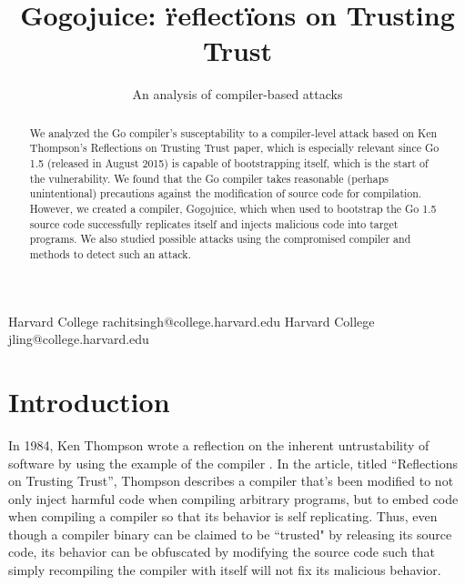 \documentclass[10pt]{sigplanconf}
\begin{document}
\setlength{\pdfpageheight}{\paperheight}
\setlength{\pdfpagewidth}{\paperwidth}






\title{Gogojuice: \"reflect\"ions on Trusting Trust}
\subtitle{An analysis of compiler-based attacks}

           {Harvard College}
           {rachitsingh@college.harvard.edu}
           {Harvard College}
           {jling@college.harvard.edu}


\begin{abstract}
We analyzed the Go compiler's susceptability to a compiler-level attack based on Ken Thompson's Reflections on Trusting Trust paper, which is especially relevant since Go 1.5 (released in August 2015) is capable of bootstrapping itself, which is the start of the vulnerability. We found that the Go compiler takes reasonable (perhaps unintentional) precautions against the modification of source code for compilation. However, we created a compiler, Gogojuice, which when used to bootstrap the Go 1.5 source code successfully replicates itself and injects malicious code into target programs. We also studied possible attacks using the compromised compiler and methods to detect such an attack.
\end{abstract}

\section{Introduction}
In 1984, Ken Thompson wrote a reflection on the inherent untrustability of software by using the example of the compiler \cite{thompson}. In the article, titled ``Reflections on Trusting Trust'', Thompson describes a compiler that's been modified to not only inject harmful code when compiling arbitrary programs, but to embed code when compiling a compiler so that its behavior is self replicating. Thus, even though a compiler binary can be claimed to be ``trusted" by releasing its source code, its behavior can be obfuscated by modifying the source code such that simply recompiling the compiler with itself will not fix its malicious behavior.
\end{document}
